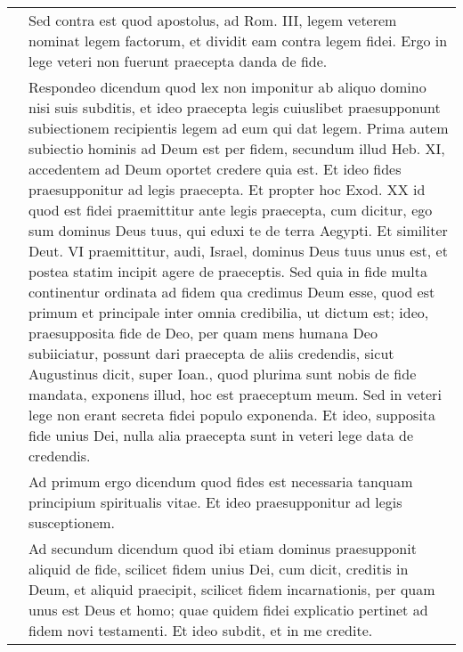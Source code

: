 \documentclass[10pt]{jsarticle} %
\begin{document}
\begin{longtable}{p{21em}p{21em}}
\\

&



Sed contra est quod apostolus, ad
Rom. III, legem veterem nominat legem factorum, et dividit eam contra
legem fidei. Ergo in lege veteri non fuerunt praecepta danda de fide.


\\

&



Respondeo dicendum quod lex non
imponitur ab aliquo domino nisi suis subditis, et ideo praecepta legis
cuiuslibet praesupponunt subiectionem recipientis legem ad eum qui dat
legem. Prima autem subiectio hominis ad Deum est per fidem, secundum
illud Heb. XI, accedentem ad Deum oportet credere quia est. Et ideo
fides praesupponitur ad legis praecepta. Et propter hoc Exod. XX id quod
est fidei praemittitur ante legis praecepta, cum dicitur, ego sum
dominus Deus tuus, qui eduxi te de terra Aegypti. Et similiter Deut. VI
praemittitur, audi, Israel, dominus Deus tuus unus est, et postea statim
incipit agere de praeceptis. Sed quia in fide multa continentur ordinata
ad fidem qua credimus Deum esse, quod est primum et principale inter
omnia credibilia, ut dictum est; ideo, praesupposita fide de Deo, per
quam mens humana Deo subiiciatur, possunt dari praecepta de aliis
credendis, sicut Augustinus dicit, super Ioan., quod plurima sunt nobis
de fide mandata, exponens illud, hoc est praeceptum meum. Sed in veteri
lege non erant secreta fidei populo exponenda. Et ideo, supposita fide
unius Dei, nulla alia praecepta sunt in veteri lege data de credendis.


\\

&



Ad primum ergo dicendum quod fides est
necessaria tanquam principium spiritualis vitae. Et ideo praesupponitur
ad legis susceptionem.


\\

&



Ad secundum dicendum quod ibi etiam
dominus praesupponit aliquid de fide, scilicet fidem unius Dei, cum
dicit, creditis in Deum, et aliquid praecipit, scilicet fidem
incarnationis, per quam unus est Deus et homo; quae quidem fidei
explicatio pertinet ad fidem novi testamenti. Et ideo subdit, et in me
credite.



\end{longtable}
\end{document}
